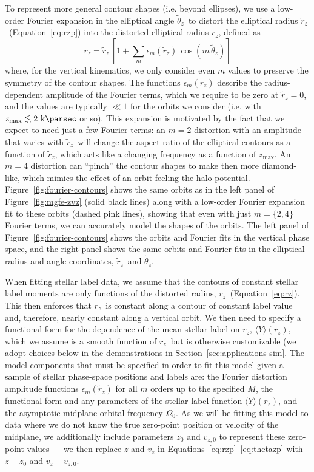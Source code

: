 \documentclass[modern]{aastex631}
\newcommand{\freqzero}{\ensuremath{\Omega_0}}
\newcommand{\mmax}{\ensuremath{M}}
\newcommand{\rz}{\ensuremath{r_z}}
\newcommand{\rzp}{\ensuremath{\tilde{r}_z}}
\newcommand{\thzp}{\ensuremath{\tilde{\theta}_z}}
\newcommand{\meanY}{\ensuremath{\langle Y \rangle}}
\begin{document}
To represent more general contour shapes (i.e. beyond ellipses), we use a low-order
Fourier expansion in the elliptical angle \thzp\ to distort the elliptical radius
\rzp\ (Equation~\ref{eq:rzp}) into the distorted elliptical radius \rz, defined as
\begin{equation}
    \rz = \rzp \, \left[1 + \sum_m \epsilon_m(\rzp) \, \cos{\left(m\,\thzp\right)}\right] \label{eq:rz}
\end{equation}
where, for the vertical kinematics, we only consider even $m$ values to preserve the
symmetry of the contour shapes.
The functions $\epsilon_m(\rzp)$ describe the radius-dependent amplitude of the Fourier
terms, which we require to be zero at $\rzp=0$, and the values are typically $\ll 1$
for the orbits we consider (i.e. with $\zmax \lesssim 2~\kpc$ or so).
This expansion is motivated by the fact that we expect to need just a few Fourier terms:
an $m=2$ distortion with an amplitude that varies with \rzp\ will change the aspect
ratio of the elliptical contours as a function of \rzp, which acts like a changing
frequency as a function of $z_{\textrm{max}}$.
An $m=4$ distortion can ``pinch'' the contour shapes to make then more diamond-like,
which mimics the effect of an orbit feeling the halo potential.
Figure~\ref{fig:fourier-contours} shows the same orbits as in the left panel of
Figure~\ref{fig:mgfe-zvz} (solid black lines) along with a low-order Fourier expansion
fit to these orbits (dashed pink lines), showing that even with just $m=\{2, 4\}$
Fourier terms, we can accurately model the shapes of the orbits.
The left panel of Figure~\ref{fig:fourier-contours} shows the orbits and Fourier fits in
the vertical phase space, and the right panel shows the same orbits and Fourier fits in
the elliptical radius and angle coordinates, \rzp\ and \thzp.

When fitting stellar label data, we assume that the contours of constant stellar label
moments are only functions of the distorted radius, \rz\ (Equation~\ref{eq:rz}). This
then enforces that \rz\ is constant along a contour of constant label value and,
therefore, nearly constant along a vertical orbit.
We then need to specify a functional form for the dependence of the mean stellar label
on \rz, $\meanY(\rz)$, which we assume is a smooth function of \rz\ but is otherwise
customizable (we adopt choices below in the demonstrations in
Section~\ref{sec:applications-sim}.
The model components that must be specified in order to fit this model given a sample of
stellar phase-space positions and labels are: the Fourier distortion amplitude functions
$\epsilon_m(\rzp)$ for all $m$ orders up to the specified \mmax, the functional form and
any parameters of the stellar label function $\meanY(\rz)$, and the asymptotic midplane
orbital frequency \freqzero.
As we will be fitting this model to data where we do not know the true zero-point
position or velocity of the midplane, we additionally include parameters $z_0$ and
$v_{z,0}$ to represent these zero-point values --- we then replace $z$ and $v_z$ in
Equations~\ref{eq:rzp}--\ref{eq:thetazp} with $z-z_0$ and $v_z - v_{z, 0}$.
\end{document}
